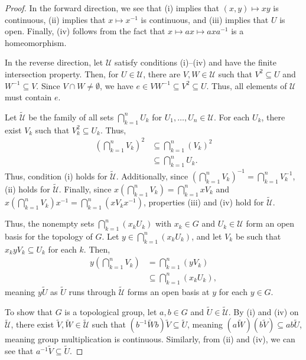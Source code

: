 \documentclass[12pt]{extarticle}
\theoremstyle{plain}
\theoremstyle{definition}
\theoremstyle{note}
\renewcommand{\newline}{\hfill\break}
\begin{document}
\begin{proof}
  In the forward direction, we see that (i) implies that $(x,y)\mapsto xy$ is continuous, (ii) implies that $x\mapsto x^{-1}$ is continuous, and (iii) implies that $U$ is open. Finally, (iv) follows from the fact that $x\mapsto ax \mapsto axa^{-1}$ is a homeomorphism.\newline

  In the reverse direction, let $\mathcal{U}$ satisfy conditions (i)--(iv) and have the finite intersection property. Then, for $U\in \mathcal{U}$, there are $V,W\in\mathcal{U}$ such that $V^2 \subseteq U$ and $W^{-1}\subseteq V$. Since $V\cap W\neq \emptyset$, we have $e\in VW^{-1}\subseteq V^2 \subseteq U$. Thus, all elements of $\mathcal{U}$ must contain $e$.\newline

  Let $\tilde{\mathcal{U}}$ be the family of all sets $\bigcap_{k=1}^{n}U_k$ for $U_1,\dots,U_n \in \mathcal{U}$. For each $U_{k}$, there exist $V_k$ such that $V_k^2 \subseteq U_k$. Thus,
  \begin{align*}
    \left(\bigcap_{k=1}^{n}V_k\right)^2 &\subseteq \bigcap_{k=1}^{n}\left(V_k\right)^2\\
                                        &\subseteq \bigcap_{k=1}^{n}U_k.
  \end{align*}
  Thus, condition (i) holds for $\tilde{\mathcal{U}}$. Additionally, since $\left(\bigcap_{k=1}^{n}V_k\right)^{-1} = \bigcap_{k=1}^{n}V_k^{-1}$, (ii) holds for $\tilde{\mathcal{U}}$. Finally, since $x\left(\bigcap_{k=1}^{n}V_k\right) = \bigcap_{k=1}^{n}xV_k$ and $x\left(\bigcap_{k=1}^{n}V_k\right)x^{-1} = \bigcap_{k=1}^{n}\left(xV_kx^{-1}\right)$, properties (iii) and (iv) hold for $\tilde{\mathcal{U}}$.\newline

  Thus, the nonempty sets $\bigcap_{k=1}^{n}\left(x_kU_k\right)$ with $x_k\in G$ and $U_k\in \mathcal{U}$ form an open basis for the topology of $G$. Let $y\in \bigcap_{k=1}^{n}\left(x_kU_k\right)$, and let $V_k$ be such that $x_kyV_k \subseteq U_k$ for each $k$. Then,
  \begin{align*}
    y\left(\bigcap_{k=1}^{n}V_k\right) &= \bigcap_{k=1}^{n}\left(yV_k\right)\\
                                       &\subseteq \bigcap_{k=1}^{n}\left(x_kU_k\right),
  \end{align*}
  meaning $y\tilde{U}$ as $\tilde{U}$ runs through $\tilde{\mathcal{U}}$ forms an open basis at $y$ for each $y\in G$.\newline

  To show that $G$ is a topological group, let $a,b\in G$ and $\tilde{U} \in \tilde{\mathcal{U}}$. By (i) and (iv) on $\tilde{\mathcal{U}}$, there exist $\tilde{V},\tilde{W}\in \tilde{\mathcal{U}}$ such that $\left(b^{-1}\tilde{W}b\right)\tilde{V}\subseteq \tilde{U}$, meaning $\left(a\tilde{W}\right)\left(b\tilde{V}\right) \subseteq ab\tilde{U}$, meaning group multiplication is continuous. Similarly, from (ii) and (iv), we can see that $a^{-1}\tilde{V} \subseteq \tilde{U}$.
\end{proof}
\end{document}
